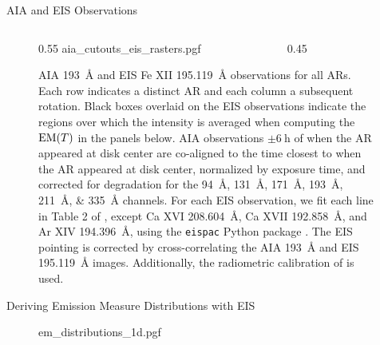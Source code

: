 \documentclass[final]{beamer}
\newcommand{\emd}{\textup{EM}(T)}
\newlength{\colwidth}
\begin{document}
\begin{frame}[t]
\begin{columns}[t]
\begin{column}{\colwidth}
\begin{block}{AIA and EIS Observations}
    \begin{figure}
      \begin{columns}[T]
        \begin{column}{0.55\colwidth}
          {aia_cutouts_eis_rasters.pgf}
        \end{column}
        \begin{column}{0.45\colwidth}
          \caption{AIA \SI{193}{\angstrom} and EIS Fe XII \SI{195.119}{\angstrom} observations for all ARs. Each row indicates a distinct AR and each column a subsequent rotation. Black boxes overlaid on the EIS observations indicate the regions over which the intensity is averaged when computing the $\emd$ in the panels below. AIA observations $\pm\SI{6}{\hour}$ of when the AR appeared at disk center are co-aligned to the time closest to when the AR appeared at disk center, normalized by exposure time, and corrected for degradation for the \SIlist{94;131;171;193;211;335}{\angstrom} channels. For each EIS observation, we fit each line in Table 2 of \citet{warren_systematic_2012}, except Ca XVI \SI{208.604}{\angstrom}, Ca XVII \SI{192.858}{\angstrom}, and Ar XIV \SI{194.396}{\angstrom}, using the \texttt{eispac} Python package \citep{weberg_eispac_2023}. The EIS pointing is corrected by cross-correlating the AIA \SI{193}{\angstrom} and EIS \SI{195.119}{\angstrom} images. Additionally, the radiometric calibration of \citet{del_zanna_hinode_2025} is used.} 
          \label{fig:aia_eis_intensities}
        \end{column}
      \end{columns}
    \end{figure}

  \end{block}

  \vspace{-35pt}

  \begin{block}{Deriving Emission Measure Distributions with EIS}

    \begin{figure}
      \centering
      {em_distributions_1d.pgf}
      \label{fig:em_distributions_1d}
    \end{figure}

    \vspace{-30pt}


\end{block}
\end{column}
\end{columns}
\end{frame}
\end{document}
